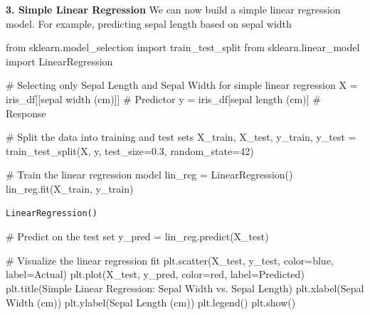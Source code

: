 \documentclass[
  letterpaper,
  DIV=11,
  numbers=noendperiod]{scrreprt}
\newenvironment{Shaded}{\begin{snugshade}}{\end{snugshade}}
\newcommand{\CommentTok}[1]{\textcolor[rgb]{0.37,0.37,0.37}{#1}}
\newcommand{\DecValTok}[1]{\textcolor[rgb]{0.68,0.00,0.00}{#1}}
\newcommand{\FloatTok}[1]{\textcolor[rgb]{0.68,0.00,0.00}{#1}}
\newcommand{\ImportTok}[1]{\textcolor[rgb]{0.00,0.46,0.62}{#1}}
\newcommand{\NormalTok}[1]{\textcolor[rgb]{0.00,0.23,0.31}{#1}}
\newcommand{\OperatorTok}[1]{\textcolor[rgb]{0.37,0.37,0.37}{#1}}
\newcommand{\StringTok}[1]{\textcolor[rgb]{0.13,0.47,0.30}{#1}}
\begin{document}
\textbf{3. Simple Linear Regression} We can now build a simple linear
regression model. For example, predicting sepal length based on sepal
width

\begin{Shaded}
\begin{Highlighting}[]
\ImportTok{from}\NormalTok{ sklearn.model\_selection }\ImportTok{import}\NormalTok{ train\_test\_split}
\ImportTok{from}\NormalTok{ sklearn.linear\_model }\ImportTok{import}\NormalTok{ LinearRegression}

\CommentTok{\# Selecting only Sepal Length and Sepal Width for simple linear regression}
\NormalTok{X }\OperatorTok{=}\NormalTok{ iris\_df[[}\StringTok{\textquotesingle{}sepal width (cm)\textquotesingle{}}\NormalTok{]]  }\CommentTok{\# Predictor}
\NormalTok{y }\OperatorTok{=}\NormalTok{ iris\_df[}\StringTok{\textquotesingle{}sepal length (cm)\textquotesingle{}}\NormalTok{]    }\CommentTok{\# Response}

\CommentTok{\# Split the data into training and test sets}
\NormalTok{X\_train, X\_test, y\_train, y\_test }\OperatorTok{=}\NormalTok{ train\_test\_split(X, y, test\_size}\OperatorTok{=}\FloatTok{0.3}\NormalTok{, random\_state}\OperatorTok{=}\DecValTok{42}\NormalTok{)}

\CommentTok{\# Train the linear regression model}
\NormalTok{lin\_reg }\OperatorTok{=}\NormalTok{ LinearRegression()}
\NormalTok{lin\_reg.fit(X\_train, y\_train)}
\end{Highlighting}
\end{Shaded}

\begin{verbatim}
LinearRegression()
\end{verbatim}

\begin{Shaded}
\begin{Highlighting}[]
\CommentTok{\# Predict on the test set}
\NormalTok{y\_pred }\OperatorTok{=}\NormalTok{ lin\_reg.predict(X\_test)}

\CommentTok{\# Visualize the linear regression fit}
\NormalTok{plt.scatter(X\_test, y\_test, color}\OperatorTok{=}\StringTok{\textquotesingle{}blue\textquotesingle{}}\NormalTok{, label}\OperatorTok{=}\StringTok{\textquotesingle{}Actual\textquotesingle{}}\NormalTok{)}
\NormalTok{plt.plot(X\_test, y\_pred, color}\OperatorTok{=}\StringTok{\textquotesingle{}red\textquotesingle{}}\NormalTok{, label}\OperatorTok{=}\StringTok{\textquotesingle{}Predicted\textquotesingle{}}\NormalTok{)}
\NormalTok{plt.title(}\StringTok{\textquotesingle{}Simple Linear Regression: Sepal Width vs. Sepal Length\textquotesingle{}}\NormalTok{)}
\NormalTok{plt.xlabel(}\StringTok{\textquotesingle{}Sepal Width (cm)\textquotesingle{}}\NormalTok{)}
\NormalTok{plt.ylabel(}\StringTok{\textquotesingle{}Sepal Length (cm)\textquotesingle{}}\NormalTok{)}
\NormalTok{plt.legend()}
\NormalTok{plt.show()}
\end{Highlighting}
\end{Shaded}
\end{document}
